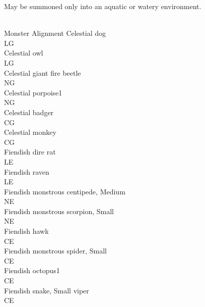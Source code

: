 {



May be summoned only into an aquatic or watery environment.

	\\


Monster
Alignment
	Celestial dog\\
	LG\\
	Celestial owl\\
	LG\\
	Celestial giant fire beetle\\
	NG\\
	Celestial porpoise1\\
	NG\\
	Celestial badger\\
	CG\\
	Celestial monkey\\
	CG\\
	Fiendish dire rat\\
	LE\\
	Fiendish raven\\
	LE\\
	Fiendish monstrous centipede, Medium\\
	NE\\
	Fiendish monstrous scorpion, Small\\
	NE\\
	Fiendish hawk\\
	CE\\
	Fiendish monstrous spider, Small\\
	CE\\
	Fiendish octopus1\\
	CE\\
	Fiendish snake, Small viper\\
	CE\\

}
